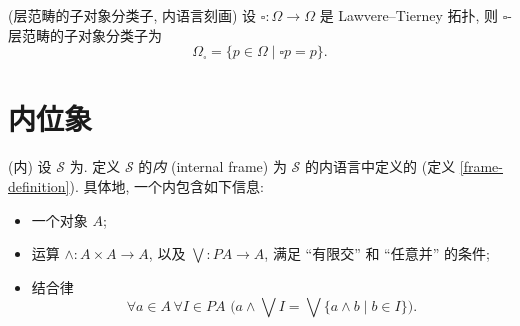 



\begin{prop}
	[label={sheaf-subobject-classifier-internal-definition}]
	{(层范畴的子对象分类子, 内语言刻画)}
	设 $\square\colon \Omega\to\Omega$ 是 Lawvere--Tierney 拓扑, 则 $\square$-层范畴的子对象分类子为
	$$
	\Omega_{\square} = \{p\in\Omega\mid \square p = p\}.
	$$
\end{prop}

\section{内位象}

\begin{prop}
	[label={internal-frame}]
	{(内\fm{})}
	设 $\mathcal S$ 为\topos{}. 定义 $\mathcal S$ 的\emph{内\fm{}} (internal frame) 为 $\mathcal S$ 的内语言中定义的\fm{} (定义 \ref{frame-definition}). 具体地, 一个内\fm{}包含如下信息:
	\begin{itemize}
		\item 一个对象 $A$;
		\item 运算 $\land\colon A\times A\to A$, 以及 $\bigvee\colon PA\to A$, 满足 ``有限交'' 和 ``任意并'' 的条件;
		\item 结合律
		\[
		\forall a\in A\,\forall I\in PA\,\,\Big(a\land \bigvee I = \bigvee \{a\land b\mid b\in I\}\Big).
		\]
	\end{itemize}
\end{prop}





